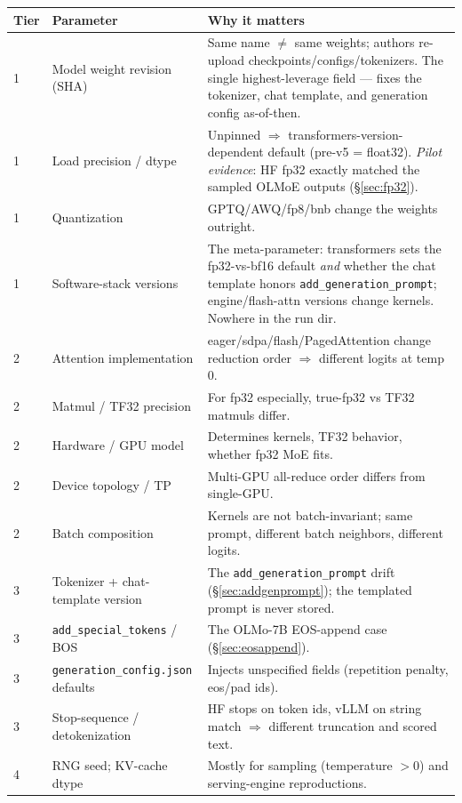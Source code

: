 \documentclass[11pt]{report}
\newcommand{\code}[1]{\texttt{#1}}
\begin{document}
\begin{longtable}{@{}p{}p{}p{}@{}}
\toprule
\textbf{Tier} & \textbf{Parameter} & \textbf{Why it matters} \\
\midrule
\endhead
1 & Model weight revision (SHA) & Same name $\ne$ same weights; authors re-upload
    checkpoints/configs/tokenizers. The single highest-leverage field --- fixes the
    tokenizer, chat template, and generation config as-of-then. \\
1 & Load precision / dtype & Unpinned $\Rightarrow$ transformers-version-dependent
    default (pre-v5 = float32). \emph{Pilot evidence}: HF fp32 exactly matched the sampled OLMoE outputs (\S\ref{sec:fp32}). \\
1 & Quantization & GPTQ/AWQ/fp8/bnb change the weights outright. \\
1 & Software-stack versions & The meta-parameter: transformers sets the fp32-vs-bf16
    default \emph{and} whether the chat template honors \code{add\_generation\_prompt};
    engine/flash-attn versions change kernels. Nowhere in the run dir. \\
\midrule
2 & Attention implementation & eager/sdpa/flash/PagedAttention change reduction order
    $\Rightarrow$ different logits at temp 0. \\
2 & Matmul / TF32 precision & For fp32 especially, true-fp32 vs TF32 matmuls differ. \\
2 & Hardware / GPU model & Determines kernels, TF32 behavior, whether fp32 MoE fits. \\
2 & Device topology / TP & Multi-GPU all-reduce order differs from single-GPU. \\
2 & Batch composition & Kernels are not batch-invariant; same prompt, different
    batch neighbors, different logits. \\
\midrule
3 & Tokenizer + chat-template version & The \code{add\_generation\_prompt} drift
    (\S\ref{sec:addgenprompt}); the templated prompt is never stored. \\
3 & \code{add\_special\_tokens} / BOS & The OLMo-7B EOS-append case
    (\S\ref{sec:eosappend}). \\
3 & \code{generation\_config.json} defaults & Injects unspecified fields
    (repetition penalty, eos/pad ids). \\
3 & Stop-sequence / detokenization & HF stops on token ids, vLLM on string match
    $\Rightarrow$ different truncation and scored text. \\
\midrule
4 & RNG seed; KV-cache dtype & Mostly for sampling (temperature $>0$) and
    serving-engine reproductions. \\
\bottomrule
\end{longtable}
\end{document}
